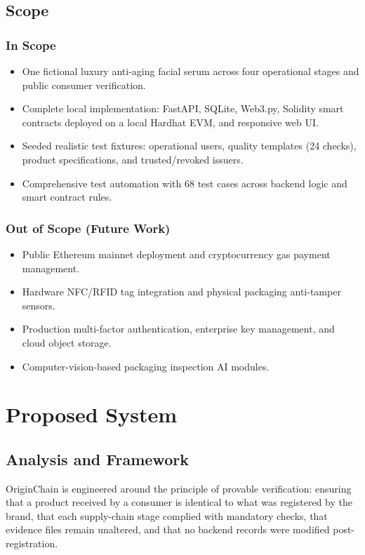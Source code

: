 \documentclass[12pt,a4paper]{report}
\begin{document}
\section{Scope}
\subsection{In Scope}
\begin{itemize}[leftmargin=1.5em]
    \item One fictional luxury anti-aging facial serum across four operational stages and public consumer verification.
    \item Complete local implementation: FastAPI, SQLite, Web3.py, Solidity smart contracts deployed on a local Hardhat EVM, and responsive web UI.
    \item Seeded realistic test fixtures: operational users, quality templates (24 checks), product specifications, and trusted/revoked issuers.
    \item Comprehensive test automation with 68 test cases across backend logic and smart contract rules.
\end{itemize}

\subsection{Out of Scope (Future Work)}
\begin{itemize}[leftmargin=1.5em]
    \item Public Ethereum mainnet deployment and cryptocurrency gas payment management.
    \item Hardware NFC/RFID tag integration and physical packaging anti-tamper sensors.
    \item Production multi-factor authentication, enterprise key management, and cloud object storage.
    \item Computer-vision-based packaging inspection AI modules.
\end{itemize}

\chapter{Proposed System}

\section{Analysis and Framework}
OriginChain is engineered around the principle of provable verification: ensuring that a product received by a consumer is identical to what was registered by the brand, that each supply-chain stage complied with mandatory checks, that evidence files remain unaltered, and that no backend records were modified post-registration.
\end{document}
